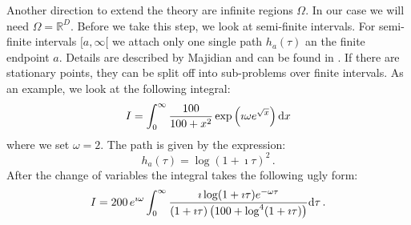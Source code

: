 \documentclass[a4paper,10pt]{article}
\begin{document}
Another direction to extend the theory are infinite regions $\Omega$. In our case we will
need $\Omega = \mathbb{R}^D$. Before we take this step, we look at semi-finite intervals.
For semi-finite intervals $[a, \infty [$ we attach only one single path $h_a(\tau)$ an the
finite endpoint $a$. Details are described by Majidian and can be found in \cite{H_nsd_sii}. If there
are stationary points, they can be split off into sub-problems over finite intervals.
As an example, we look at the following integral:
\begin{equation}
  I = \int_0^\infty \frac{100}{100 + x^2} \exp\left(\imath \omega e^{\sqrt{x}}\right) \mathrm{d}x
\end{equation}
where we set $\omega = 2$. The path is given by the expression:
\begin{equation}
  h_a(\tau) = \log(1 + \imath\tau)^2 \,.
\end{equation}
After the change of variables the integral takes the following ugly form:
\begin{equation}
  I = 200 \, e^{\imath\omega}
      \int_0^{\infty}
        \frac{\imath \log(1+\imath\tau) e^{-\omega\tau}}
             {(1 + \imath\tau)\left(100+\log^4(1+\imath\tau)\right)}
      \mathrm{d}\tau \,.
\end{equation}
\end{document}
